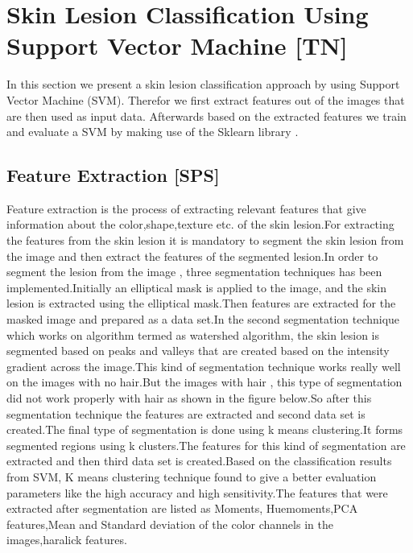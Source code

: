 
\section{Skin Lesion Classification Using Support Vector Machine [TN]}\label{sec:svm}
In this section we present a skin lesion classification approach by using Support Vector Machine (SVM). Therefor we first extract features out of the images that are then used as input data. Afterwards based on the extracted features we train and evaluate a SVM by making use of the Sklearn library \cite{scikit-learn}.   
\subsection{Feature Extraction [SPS]}

Feature extraction is the process of extracting relevant features that give information about the color,shape,texture etc. of the skin lesion.For extracting the features from the skin lesion it is mandatory to segment the skin lesion from the image and  then extract the features of the segmented lesion.In order to segment the lesion from the image , three segmentation techniques has been implemented.Initially an elliptical mask is applied to the image, and the skin lesion is extracted using the elliptical mask.Then features are extracted for the masked image and prepared as a data set.In the second segmentation technique which works on algorithm termed as watershed algorithm, the skin lesion is segmented based on peaks and valleys that are created based on the intensity gradient across the image.This kind of segmentation technique works really well on the images with no hair.But the images with hair , this type of segmentation did not work properly with hair as shown in the figure below.So after this segmentation technique the features are extracted and second data set is created.The final type of segmentation is done using k means clustering.It forms segmented regions using k clusters.The features for this kind of segmentation are extracted and then third data set is created.Based on the classification results from SVM, K means clustering technique found to give a better evaluation parameters like the high accuracy and high sensitivity.The features that were extracted after segmentation are listed as Moments, Huemoments,PCA features,Mean and Standard deviation of the color channels in the images,haralick features.
